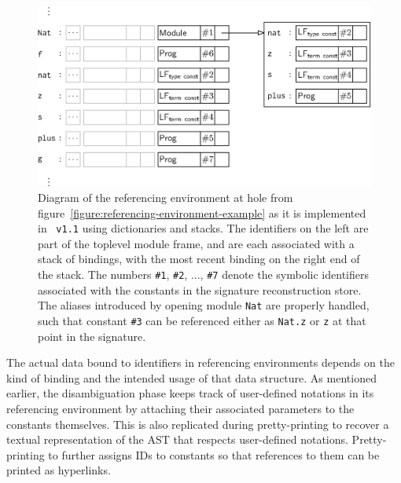 \begin{figure}[htb]
\centering
\includegraphics{figures/referencing-environment-implementation.eps}
\caption[Example referencing environment in the implementation]{%
Diagram of the referencing environment at hole \texttt{} from figure~\ref{figure:referencing-environment-example} as it is implemented in \Beluga~\texttt{v1.1} using dictionaries and stacks.
The identifiers on the left are part of the toplevel module frame, and are each associated with a stack of bindings, with the most recent binding on the right end of the stack.
The numbers \texttt{\#1}, \texttt{\#2}, ..., \texttt{\#7} denote the symbolic identifiers associated with the constants in the signature reconstruction store.
The aliases introduced by opening module \texttt{Nat} are properly handled, such that constant \texttt{\#3} can be referenced either as \texttt{Nat.z} or \texttt{z} at that point in the signature.
}
\label{figure:referencing-environment-implementation}
\end{figure}

The actual data bound to identifiers in referencing environments depends on the kind of binding and the intended usage of that data structure.
As mentioned earlier, the disambiguation phase keeps track of user-defined notations in its referencing environment by attaching their associated parameters to the constants themselves.
This is also replicated during pretty-printing to recover a textual representation of the \ac{AST} that respects user-defined notations.
Pretty-printing to \HTML further assigns IDs to constants so that references to them can be printed as hyperlinks.

